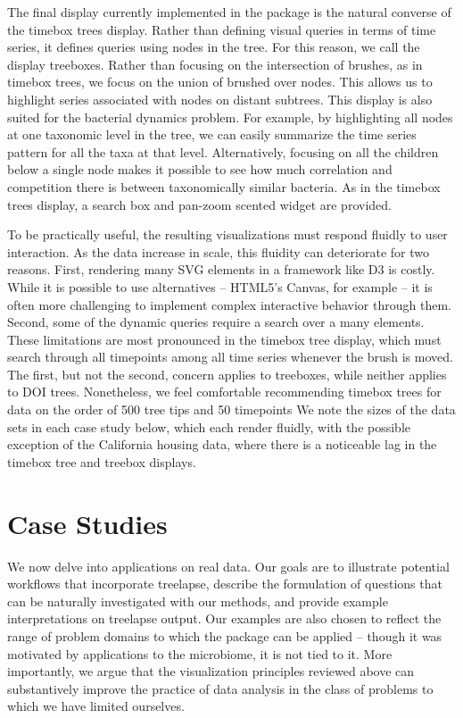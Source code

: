\documentclass[12pt]{article}
\begin{document}
The final display currently implemented in the package is the natural converse
of the timebox trees display. Rather than defining visual queries in terms of
time series, it defines queries using nodes in the tree. For this reason, we
call the display treeboxes. Rather than focusing on the intersection of brushes,
as in timebox trees, we focus on the union of brushed over nodes. This allows us
to highlight series associated with nodes on distant subtrees. This display is
also suited for the bacterial dynamics problem. For example, by highlighting all
nodes at one taxonomic level in the tree, we can easily summarize the time
series pattern for all the taxa at that level. Alternatively, focusing on all
the children below a single node makes it possible to see how much correlation
and competition there is between taxonomically similar bacteria. As in the
timebox trees display, a search box and pan-zoom scented widget are provided.

To be practically useful, the resulting visualizations must respond fluidly to
user interaction. As the data increase in scale, this fluidity can deteriorate
for two reasons. First, rendering many SVG elements in a framework like D3 is
costly\citep{johnson2008scalability}. While it is possible to use alternatives
-- HTML5's Canvas, for example -- it is often more challenging to implement
complex interactive behavior through them. Second, some of the dynamic queries
require a search over a many elements. These limitations are most pronounced in
the timebox tree display, which must search through all timepoints among all
time series whenever the brush is moved. The first, but not the second, concern
applies to treeboxes, while neither applies to DOI trees. Nonetheless, we feel
comfortable recommending timebox trees for data on the order of 500 tree tips
and 50 timepoints We note the sizes of the data sets in each case study below,
which each render fluidly, with the possible exception of the California housing
data, where there is a noticeable lag in the timebox tree and treebox displays.

\section{Case Studies}\label{case-studies}

We now delve into applications on real data. Our goals are to illustrate
potential workflows that incorporate treelapse, describe the formulation of
questions that can be naturally investigated with our methods, and provide
example interpretations on treelapse output. Our examples are also chosen to
reflect the range of problem domains to which the package can be applied --
though it was motivated by applications to the microbiome, it is not tied to it.
More importantly, we argue that the visualization principles reviewed above can
substantively improve the practice of data analysis in the class of problems to
which we have limited ourselves.
\end{document}
